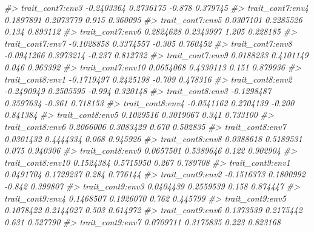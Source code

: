 \documentclass[
]{article}
\newenvironment{Shaded}{\begin{snugshade}}{\end{snugshade}}
\newcommand{\CommentTok}[1]{\textcolor[rgb]{0.56,0.35,0.01}{\textit{#1}}}
\begin{document}
\begin{Shaded}
\begin{Highlighting}[]
\CommentTok{\#\textgreater{} trait\_cont7:env3              {-}0.2403364  0.2736175  {-}0.878 0.379745    }
\CommentTok{\#\textgreater{} trait\_cont7:env4               0.1897891  0.2073779   0.915 0.360095    }
\CommentTok{\#\textgreater{} trait\_cont7:env5               0.0307101  0.2285526   0.134 0.893112    }
\CommentTok{\#\textgreater{} trait\_cont7:env6               0.2824628  0.2343997   1.205 0.228185    }
\CommentTok{\#\textgreater{} trait\_cont7:env7              {-}0.1028858  0.3374557  {-}0.305 0.760452    }
\CommentTok{\#\textgreater{} trait\_cont7:env8              {-}0.0941266  0.3973214  {-}0.237 0.812732    }
\CommentTok{\#\textgreater{} trait\_cont7:env9               0.0188233  0.4101149   0.046 0.963392    }
\CommentTok{\#\textgreater{} trait\_cont7:env10              0.0654068  0.4330113   0.151 0.879936    }
\CommentTok{\#\textgreater{} trait\_cont8:env1              {-}0.1719497  0.2425198  {-}0.709 0.478316    }
\CommentTok{\#\textgreater{} trait\_cont8:env2              {-}0.2490949  0.2505595  {-}0.994 0.320148    }
\CommentTok{\#\textgreater{} trait\_cont8:env3              {-}0.1298487  0.3597634  {-}0.361 0.718153    }
\CommentTok{\#\textgreater{} trait\_cont8:env4              {-}0.0541162  0.2704139  {-}0.200 0.841384    }
\CommentTok{\#\textgreater{} trait\_cont8:env5               0.1029516  0.3019067   0.341 0.733100    }
\CommentTok{\#\textgreater{} trait\_cont8:env6               0.2066006  0.3083429   0.670 0.502835    }
\CommentTok{\#\textgreater{} trait\_cont8:env7               0.0301432  0.4444334   0.068 0.945926    }
\CommentTok{\#\textgreater{} trait\_cont8:env8               0.0388618  0.5189531   0.075 0.940306    }
\CommentTok{\#\textgreater{} trait\_cont8:env9               0.0657501  0.5389646   0.122 0.902904    }
\CommentTok{\#\textgreater{} trait\_cont8:env10              0.1524384  0.5715950   0.267 0.789708    }
\CommentTok{\#\textgreater{} trait\_cont9:env1               0.0491704  0.1729237   0.284 0.776144    }
\CommentTok{\#\textgreater{} trait\_cont9:env2              {-}0.1516373  0.1800992  {-}0.842 0.399807    }
\CommentTok{\#\textgreater{} trait\_cont9:env3               0.0404439  0.2559539   0.158 0.874447    }
\CommentTok{\#\textgreater{} trait\_cont9:env4               0.1468507  0.1926070   0.762 0.445799    }
\CommentTok{\#\textgreater{} trait\_cont9:env5               0.1078422  0.2144027   0.503 0.614972    }
\CommentTok{\#\textgreater{} trait\_cont9:env6               0.1373539  0.2175442   0.631 0.527790    }
\CommentTok{\#\textgreater{} trait\_cont9:env7               0.0709711  0.3175835   0.223 0.823168    }

\end{Highlighting}
\end{Shaded}
\end{document}
